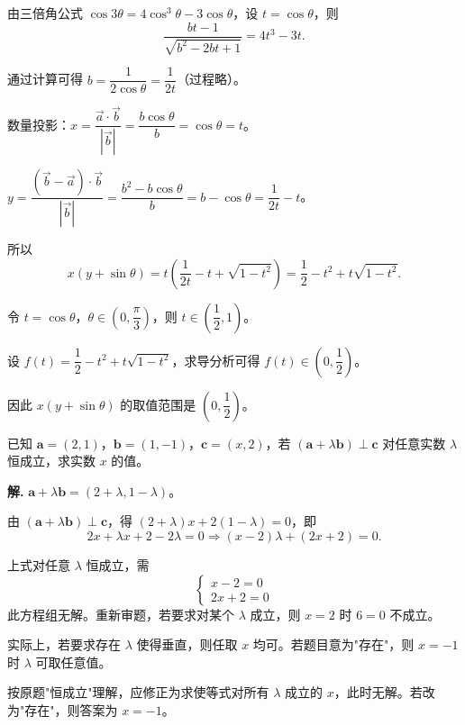\documentclass[11pt]{ctexrep}
\begin{document}
由三倍角公式 $\cos 3\theta = 4\cos^3\theta - 3\cos\theta$，设 $t = \cos\theta$，则
\[
    \dfrac{b t - 1}{\sqrt{b^2 - 2bt + 1}} = 4t^3 - 3t.
\]

通过计算可得 $b = \dfrac{1}{2\cos\theta} = \dfrac{1}{2t}$（过程略）。

数量投影：$x = \dfrac{\overrightarrow{a} \cdot \overrightarrow{b}}{|\overrightarrow{b}|} = \dfrac{b\cos\theta}{b} = \cos\theta = t$。

$y = \dfrac{(\overrightarrow{b}-\overrightarrow{a}) \cdot \overrightarrow{b}}{|\overrightarrow{b}|} = \dfrac{b^2 - b\cos\theta}{b} = b - \cos\theta = \dfrac{1}{2t} - t$。

所以
\[
    x(y + \sin\theta) = t\left(\dfrac{1}{2t} - t + \sqrt{1-t^2}\right) = \dfrac{1}{2} - t^2 + t\sqrt{1-t^2}.
\]

令 $t = \cos\theta$，$\theta \in \left(0, \dfrac{\pi}{3}\right)$，则 $t \in \left(\dfrac{1}{2}, 1\right)$。

设 $f(t) = \dfrac{1}{2} - t^2 + t\sqrt{1-t^2}$，求导分析可得 $f(t) \in \left(0, \dfrac{1}{2}\right)$。

因此 $x(y + \sin\theta)$ 的取值范围是 $\left(0, \dfrac{1}{2}\right)$。

\begin{example}[练习]
    已知 $\boldsymbol{a} = (2, 1)$，$\boldsymbol{b} = (1, -1)$，$\boldsymbol{c} = (x, 2)$，若 $(\boldsymbol{a} + \lambda\boldsymbol{b}) \perp \boldsymbol{c}$ 对任意实数 $\lambda$ 恒成立，求实数 $x$ 的值。
\end{example}

\textbf{解.} $\boldsymbol{a} + \lambda\boldsymbol{b} = (2+\lambda, 1-\lambda)$。

由 $(\boldsymbol{a} + \lambda\boldsymbol{b}) \perp \boldsymbol{c}$，得 $(2+\lambda)x + 2(1-\lambda) = 0$，即
\[
    2x + \lambda x + 2 - 2\lambda = 0 \Rightarrow (x-2)\lambda + (2x+2) = 0.
\]

上式对任意 $\lambda$ 恒成立，需
\[
    \begin{cases}
        x - 2 = 0 \\
        2x + 2 = 0
    \end{cases}
\]
此方程组无解。重新审题，若要求对某个 $\lambda$ 成立，则 $x = 2$ 时 $6 = 0$ 不成立。

实际上，若要求存在 $\lambda$ 使得垂直，则任取 $x$ 均可。若题目意为"存在"，则 $x = -1$ 时 $\lambda$ 可取任意值。

按原题"恒成立"理解，应修正为求使等式对所有 $\lambda$ 成立的 $x$，此时无解。若改为"存在"，则答案为 $x = -1$。
\end{document}

